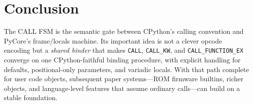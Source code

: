 \documentclass[11pt,a4paper]{article}
\begin{document}
\section{Conclusion}

The CALL FSM is the semantic gate between CPython's calling convention and
PyCore's frame/locals machine.
Its important idea is not a clever opcode encoding but a \emph{shared binder}
that makes \texttt{CALL}, \texttt{CALL\_KW}, and \texttt{CALL\_FUNCTION\_EX}
converge on one CPython-faithful binding procedure, with explicit handling for
defaults, positional-only parameters, and variadic locals.
With that path complete for user code objects, subsequent paper systems---ROM
firmware builtins, richer objects, and language-level features that assume
ordinary calls---can build on a stable foundation.
\end{document}
